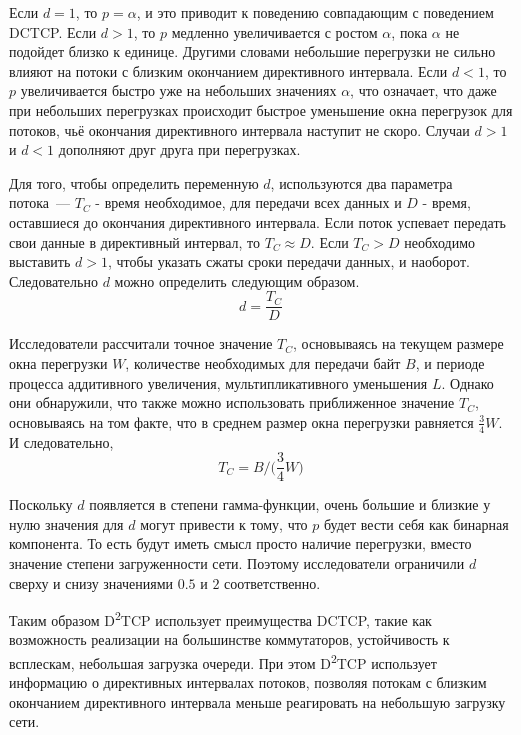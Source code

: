 \documentclass[14pt, a4paper,oneside]{extarticle}
\begin{document}
Если $d = 1$, то $p = \alpha$, и это приводит к поведению совпадающим с поведением DCTCP. Если $d > 1$, то $p$ медленно увеличивается с ростом $\alpha$, пока $\alpha$ не подойдет близко к единице. Другими словами небольшие перегрузки не сильно влияют на потоки с близким окончанием директивного интервала. Если $d < 1$, то $p$ увеличивается быстро уже на небольших значениях $\alpha$, что означает, что даже при небольших перегрузках происходит быстрое уменьшение окна перегрузок для потоков, чьё окончания директивного интервала наступит не скоро.
Случаи $d > 1$ и $d < 1$ дополняют друг друга при перегрузках.
 
Для того, чтобы определить переменную $d$, используются два параметра потока~--- $T_C$ - время необходимое, для передачи всех данных и $D$ - время, оставшиеся до окончания директивного интервала. Если поток успевает передать свои данные в директивный интервал, то $T_C \approx D$. Если $T_C > D$ необходимо выставить $d > 1$, чтобы указать сжаты сроки передачи данных, и наоборот. Следовательно $d$ можно определить следующим образом.
$$ d = \frac{T_C}{D}$$

Исследователи рассчитали точное значение $T_C$, основываясь на текущем размере окна перегрузки $W$, количестве необходимых для передачи байт $B$, и периоде процесса аддитивного увеличения, мультипликативного уменьшения $L$. Однако они обнаружили, что также можно использовать приближенное значение $T_C$, основываясь на том факте, что в среднем размер окна перегрузки равняется $\frac{3}{4}W$. И следовательно,
$$T_C = B / \big( \frac{3}{4}W \big)$$ 

Поскольку $d$ появляется в степени гамма-функции, очень большие и близкие у нулю значения для $d$ могут привести к тому, что $p$ будет вести себя как бинарная компонента. То есть будут иметь смысл просто наличие перегрузки, вместо значение степени загруженности сети. Поэтому исследователи ограничили $d$ сверху и снизу значениями $0.5$  и $2$ соответственно.

Таким образом D\textsuperscript{2}TCP использует преимущества DCTCP, такие как возможность реализации на большинстве коммутаторов, устойчивость к всплескам, небольшая загрузка очереди. При этом D\textsuperscript{2}TCP использует информацию о директивных интервалах потоков, позволяя потокам с близким окончанием директивного интервала меньше реагировать на небольшую загрузку сети.

\newpage
\end{document}
